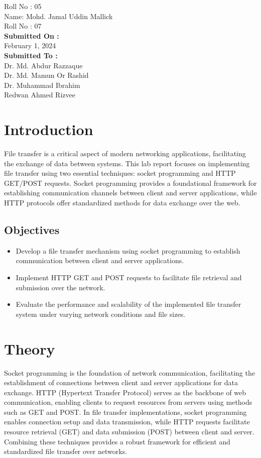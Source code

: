 \documentclass[11pt]{article}
\begin{document}
\begin{titlepage}
\begin{center}
\begin{large}
            Roll No : 05\\[12pt]
            Name: Mohd. Jamal Uddin Mallick\\[8pt]
            Roll No : 07\\[12pt]
            \textbf{Submitted On : \\[12pt]}
            February 1, 2024\\[20pt]
            \textbf{Submitted To :\\[12pt]}
            Dr. Md. Abdur Razzaque\\[12pt]
            Dr. Md. Mamun Or Rashid\\[12pt]
            Dr. Muhammad Ibrahim\\[12pt]
            Redwan Ahmed Rizvee
        \end{large}
\end{center}
\end{titlepage}

\section{Introduction}
File transfer is a critical aspect of modern networking applications, facilitating the exchange of data between systems. This lab report focuses on implementing file transfer using two essential techniques: socket programming and HTTP GET/POST requests. Socket programming provides a foundational framework for establishing communication channels between client and server applications, while HTTP protocols offer standardized methods for data exchange over the web.

\subsection{Objectives}
\begin{itemize}
    \item Develop a file transfer mechanism using socket programming to establish communication between client and server applications.
    \item Implement HTTP GET and POST requests to facilitate file retrieval and submission over the network.
    \item Evaluate the performance and scalability of the implemented file transfer system under varying network conditions and file sizes.
\end{itemize}
\section{Theory}
Socket programming is the foundation of network communication, facilitating the establishment of connections between client and server applications for data exchange. HTTP (Hypertext Transfer Protocol) serves as the backbone of web communication, enabling clients to request resources from servers using methods such as GET and POST. In file transfer implementations, socket programming enables connection setup and data transmission, while HTTP requests facilitate resource retrieval (GET) and data submission (POST) between client and server. Combining these techniques provides a robust framework for efficient and standardized file transfer over networks.
\end{document}
